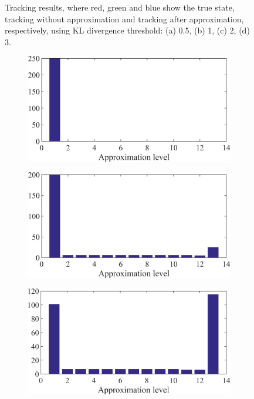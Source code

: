 \begin{figure}
\begin{subfigure}[tb]{0.2\textwidth}
        \caption{}
    \end{subfigure}
    \caption{Tracking results, where red, green and blue show the true state, tracking without approximation and tracking after approximation, respectively, using KL divergence threshold: (a) 0.5, (b) 1, (c) 2, (d) 3.}
    \label{fig:track_res}
\end{figure}







\begin{figure}
    \centering
    \begin{subfigure}[tb]{0.2\textwidth}
        \includegraphics[width=\textwidth]{img/Hist_KL_0_5.png}
        \caption{}
    \end{subfigure}
    \begin{subfigure}[tb]{0.2\textwidth}
        \includegraphics[width=\textwidth]{img/Hist_KL_1.png}
        \caption{}
    \end{subfigure}
        \begin{subfigure}[tb]{0.2\textwidth}
        \includegraphics[width=\textwidth]{img/Hist_KL_2.png}

\end{subfigure}
\end{figure}

